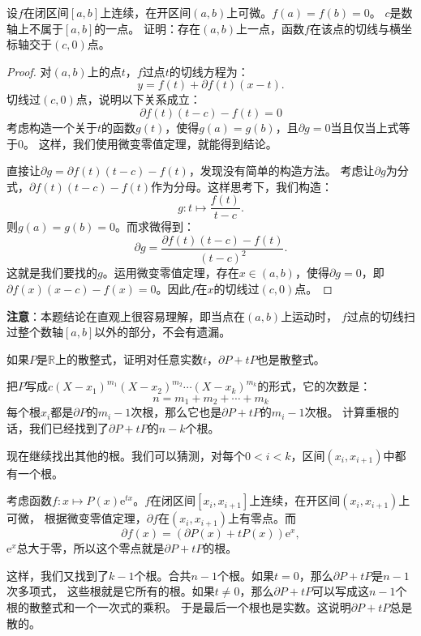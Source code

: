 \documentclass[12pt,UTF8]{ctexbook}
\begin{document}
\begin{ex}\label{ex:3-2-4-1}
    设$f$在闭区间$[a, b]$上连续，在开区间$(a, b)$上可微。$f(a) = f(b) = 0$。
    $c$是数轴上不属于$[a, b]$的一点。
    证明：存在$(a, b)$上一点，函数$f$在该点的切线与横坐标轴交于$(c, 0)$点。
\end{ex}

\begin{proof}
    对$(a, b)$上的点$t$，$f$过点$t$的切线方程为：
    $$ y = f(t) + \partial f(t) (x - t).$$
    切线过$(c, 0)$点，说明以下关系成立：
    $$ \partial f(t) (t - c) - f(t) = 0$$
    考虑构造一个关于$t$的函数$g(t)$，使得$g(a) = g(b)$，且$\partial g = 0$当且仅当上式等于$0$。
    这样，我们使用微变零值定理，就能得到结论。

    直接让$\partial g = \partial f(t) (t - c) - f(t)$，发现没有简单的构造方法。
    考虑让$\partial g$为分式，$\partial f(t) (t - c) - f(t)$作为分母。这样思考下，我们构造：
    $$ g: t\mapsto \frac{f(t)}{t - c}.$$
    则$g(a) = g(b) = 0$。而求微得到：
    $$ \partial g = \frac{\partial f(t) (t - c) - f(t)}{(t - c)^2}.$$
    这就是我们要找的$g$。运用微变零值定理，存在$x\in(a, b)$，使得$\partial g = 0$，即
    $\partial f(x) (x - c) - f(x) = 0$。因此$f$在$x$的切线过$(c, 0)$点。
\end{proof}

\textbf{注意}：本题结论在直观上很容易理解，即当点在$(a, b)$上运动时，
$f$过点的切线扫过整个数轴$[a, b]$以外的部分，不会有遗漏。


\begin{ex}\label{ex:3-2-4-10}
    如果$P$是$\mathbb{R}$上的散整式，证明对任意实数$t$，$\partial P + tP$也是散整式。
\end{ex}

\begin{so}
    把$P$写成$c(X - x_1)^{m_1}(X - x_2)^{m_2}\cdots(X - x_k)^{m_k}$的形式，它的次数是：
    $$n = m_1 + m_2 + \cdots +m_k$$
    每个根$x_i$都是$\partial P$的$m_i - 1$次根，那么它也是$\partial P + tP$的$m_i - 1$次根。
    计算重根的话，我们已经找到了$\partial P + tP$的$n - k$个根。

    现在继续找出其他的根。我们可以猜测，对每个$0<i<k$，区间$(x_i, x_{i+1})$中都有一个根。

    考虑函数$f:x\mapsto P(x)\mathrm{e}^{tx}$。$f$在闭区间$[x_i, x_{i+1}]$上连续，在开区间$(x_i, x_{i+1})$上可微，
    根据微变零值定理，$\partial f$在$(x_i, x_{i+1})$上有零点。而 
    $$ \partial f (x) = (\partial P(x) + tP(x))\mathrm{e}^x,$$
    $\mathrm{e}^x$总大于零，所以这个零点就是$\partial P + tP$的根。

    这样，我们又找到了$k-1$个根。合共$n-1$个根。如果$t=0$，那么$\partial P + tP$是$n-1$次多项式，
    这些根就是它所有的根。如果$t\neq 0$，那么$\partial P + tP$可以写成这$n-1$个根的散整式和一个一次式的乘积。
    于是最后一个根也是实数。这说明$\partial P + tP$总是散的。

\end{so}
\end{document}
